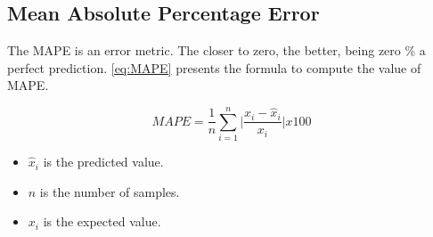 \subsection{Mean Absolute Percentage Error}
The \ac{MAPE} is an error metric. The closer to zero, the better, being zero \% a perfect prediction. 
\autoref{eq:MAPE} presents the formula to compute the value of \ac{MAPE}.

\begin{equation}\label{eq:MAPE}
    MAPE = \frac{1}{n} \sum_{i=1}^{n} \bigg| \frac{x_i - \hat{x}_i}{x_i} \bigg| x 100
\end{equation}

\begin{itemize}
    \item \begin{math}\hat{x}_i\end{math} is the predicted value.
    \item \begin{math}n\end{math} is the number of samples.
    \item \begin{math}x_i\end{math} is the expected value.
\end{itemize}




